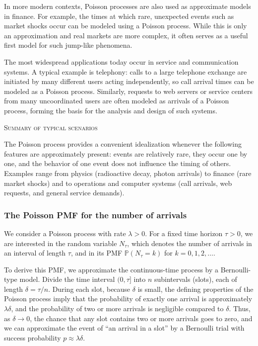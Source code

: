 In more modern contexts, Poisson processes are also used as approximate models in finance.  
For example, the times at which rare, unexpected events such as market shocks occur can be modeled using a Poisson process.  
While this is only an approximation and real markets are more complex, it often serves as a useful first model for such jump-like phenomena.  

The most widespread applications today occur in service and communication systems.  
A typical example is telephony: calls to a large telephone exchange are initiated by many different users acting independently, so call arrival times can be modeled as a Poisson process.  
Similarly, requests to web servers or service centers from many uncoordinated users are often modeled as arrivals of a Poisson process, forming the basis for the analysis and design of such systems.  

\bigskip
\textsc{Summary of typical scenarios}

The Poisson process provides a convenient idealization whenever the following features are approximately present:  
events are relatively rare, they occur one by one, and the behavior of one event does not influence the timing of others.  
Examples range from physics (radioactive decay, photon arrivals) to finance (rare market shocks) and to operations and computer systems (call arrivals, web requests, and general service demands).


\subsubsection{The Poisson PMF for the number of arrivals}

We consider a Poisson process with rate \(\lambda > 0\).  
For a fixed time horizon \(\tau > 0\), we are interested in the random variable \(N_\tau\), which denotes the number of arrivals in an interval of length \(\tau\), and in its PMF \(\mathbb{P}(N_\tau = k)\) for \(k = 0,1,2,\dots\).  

To derive this PMF, we approximate the continuous-time process by a Bernoulli-type model.  
Divide the time interval \((0,\tau]\) into \(n\) subintervals (slots), each of length \(\delta = \tau/n\).  
During each slot, because \(\delta\) is small, the defining properties of the Poisson process imply that the probability of exactly one arrival is approximately \(\lambda \delta\), and the probability of two or more arrivals is negligible compared to \(\delta\).  
Thus, as \(\delta \to 0\), the chance that any slot contains two or more arrivals goes to zero, and we can approximate the event of “an arrival in a slot” by a Bernoulli trial with success probability \(p \approx \lambda \delta\).  

